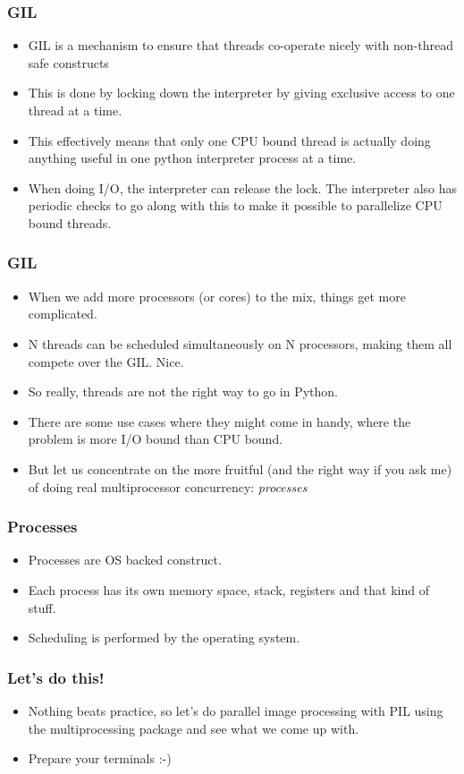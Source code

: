 \documentclass[13pt,xcolor=dvipsnames]{beamer}
\begin{document}
\begin{frame}
    \frametitle{GIL}
    \begin{itemize}
        \item GIL is a mechanism to ensure that threads co-operate nicely with non-thread safe constructs 
        \item This is done by locking down the interpreter by giving exclusive access to one thread at a time.
        \item This effectively means that only one CPU bound thread is actually doing anything useful in one
            python interpreter process at a time.
        \item When doing I/O, the interpreter can release the lock. The interpreter also has periodic checks to go along
            with this to make it possible to parallelize CPU bound threads.
    \end{itemize}
\end{frame}

\begin{frame}
    \frametitle{GIL}
    \begin{itemize}
        \item When we add more processors (or cores) to the mix, things get more complicated.
        \item N threads can be scheduled simultaneously on N processors, making them all compete over the GIL. Nice.
        \item So really, threads are not the right way to go in Python.
        \item There are some use cases where they might come in handy, where the problem is more I/O bound than CPU
            bound.
        \item But let us concentrate on the more fruitful (and the right way if you ask me) of doing real multiprocessor concurrency: \emph{processes}
    \end{itemize}
\end{frame}

\begin{frame}
    \frametitle{Processes}
    \begin{itemize}
        \item Processes are OS backed construct.
        \item Each process has its own memory space, stack, registers and that kind of stuff.
        \item Scheduling is performed by the operating system.
    \end{itemize}
\end{frame}

\begin{frame}
    \frametitle{Let's do this!}
    \begin{itemize}
        \item Nothing beats practice, so let's do parallel image processing with PIL using the multiprocessing package
            and see what we come up with. 
        \item Prepare your terminals :-)
    \end{itemize}
\end{frame}
\end{document}

